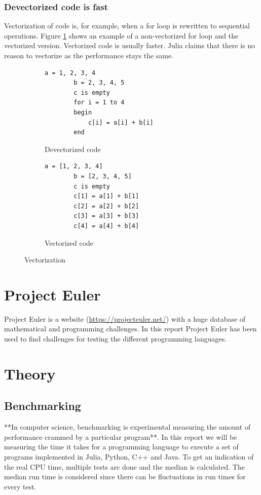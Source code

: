 \documentclass[a4paper, 11pt, titlepage]{article}
\begin{document}
\subsubsection{Devectorized code is fast}
Vectorization of code is, for example, when a for loop is rewritten to sequential operations. Figure \ref{vec} shows an example of a non-vectorized for loop and the vectorized version. Vectorized code is usually faster. Julia claims that there is no reason to vectorize as the performance stays the same.

\begin{figure}[H]
	\centering
	\begin{subfigure}[H]{0.7\textwidth}
		\centering
		\begin{lstlisting}[belowskip=0.5mm]
		a = 1, 2, 3, 4
		b = 2, 3, 4, 5
		c is empty
		for i = 1 to 4
		begin
			c[i] = a[i] + b[i]
		end
		\end{lstlisting}
		\caption{Devectorized code}
	\end{subfigure}
	\begin{subfigure}[H]{0.7\textwidth}
		\centering
		\begin{lstlisting}[belowskip=0.5mm]
		a = [1, 2, 3, 4]
		b = [2, 3, 4, 5]
		c is empty
		c[1] = a[1] + b[1]
		c[2] = a[2] + b[2]
		c[3] = a[3] + b[3]
		c[4] = a[4] + b[4]
		\end{lstlisting}
		\caption{Vectorized code}
	\end{subfigure}	
	\caption{Vectorization}
	\label{vec}
\end{figure}

\section{Project Euler}
Project Euler is a website (\url{https://projecteuler.net/}) with a huge database of mathematical and programming challenges. In this report Project Euler has been used to find challenges for testing the different programming languages.

\section{Theory}
\subsection{Benchmarking}
**In computer science, benchmarking is experimental measuring the amount of performance crammed by a particular program**. In this report we will be measuring the time it takes for a programming language to execute a set of programs implemented in Julia, Python, C++ and Java. To get an indication of the real CPU time, multiple tests are done and the median is calculated. The median run time is considered since there can be fluctuations in run times for every test.
\end{document}
